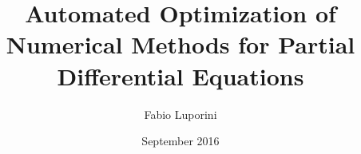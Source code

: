 


\title{Automated Optimization of Numerical Methods for Partial Differential Equations}
\author{Fabio Luporini}
\date{September 2016}

\dedication{To Alice}



\maketitle


\begin{abstract}

\end{abstract}


\makededication


\tableofcontents

\mainmatter






















